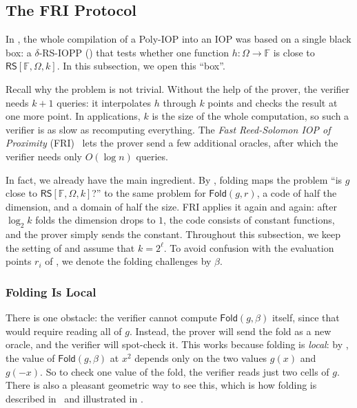 \documentclass[../../book]{subfiles}
\begin{document}
\subsection{The FRI Protocol}\label{subsec:fri}

In , the whole compilation of a Poly-IOP into an IOP was based on a single black box: a $\delta$-RS-IOPP () that tests whether one function $h: \Omega \to \mathbb{F}$ is close to $\mathsf{RS}[\mathbb{F}, \Omega, k]$.
In this subsection, we open this ``box''.

Recall why the problem is not trivial.
Without the help of the prover, the verifier needs $k + 1$ queries: it interpolates $h$ through $k$ points and checks the result at one more point.
In applications, $k$ is the size of the whole computation, so such a verifier is as slow as recomputing everything.
The \emph{Fast Reed-Solomon IOP of Proximity} (FRI)~\cite{bensasson18} lets the prover send a few additional oracles, after which the verifier needs only $O(\log n)$ queries.

In fact, we already have the main ingredient.
By , folding maps the problem ``is $g$ close to $\mathsf{RS}[\mathbb{F}, \Omega, k]$?'' to the same problem for $\mathsf{Fold}(g, r)$, a code of half the dimension, and a domain of half the size.
FRI applies it again and again: after $\log_2 k$ folds the dimension drops to $1$, the code consists of constant functions, and the prover simply sends the constant.
Throughout this subsection, we keep the setting of  and assume that $k = 2^\ell$.
To avoid confusion with the evaluation points $r_i$ of , we denote the folding challenges by $\beta$.

\subsubsection{Folding Is Local}\label{subsubsec:fri-folding}

There is one obstacle: the verifier cannot compute $\mathsf{Fold}(g, \beta)$ itself, since that would require reading all of $g$.
Instead, the prover will send the fold as a new oracle, and the verifier will spot-check it.
This works because folding is \emph{local}: by , the value of $\mathsf{Fold}(g, \beta)$ at $x^2$ depends only on the two values $g(x)$ and $g(-x)$.
So to check one value of the fold, the verifier reads just two cells of $g$.
There is also a pleasant geometric way to see this, which is how folding is described in~\cite{bensasson18} and illustrated in .
\end{document}
